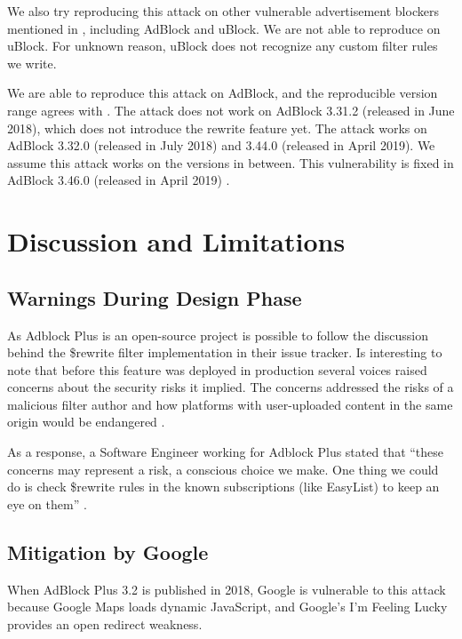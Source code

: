 \documentclass[conference]{IEEEtran}
\begin{document}
We also try reproducing this attack on other vulnerable advertisement blockers mentioned in \cite{abp_code_injection}, including AdBlock and uBlock. We are not able to reproduce on uBlock. For unknown reason, uBlock does not recognize any custom filter rules we write.

We are able to reproduce this attack on AdBlock, and the reproducible version range agrees with \cite{abp_code_injection}. The attack does not work on AdBlock 3.31.2 (released in June 2018), which does not introduce the rewrite feature yet. The attack works on AdBlock 3.32.0 (released in July 2018) and 3.44.0 (released in April 2019). We assume this attack works on the versions in between. This vulnerability is fixed in AdBlock 3.46.0 (released in April 2019) \cite{cr4chrome_ab}.

\section{Discussion and Limitations}

\subsection{Warnings During Design Phase}

As Adblock Plus is an open-source project is possible to follow the discussion behind the \$rewrite filter implementation in their issue tracker. Is interesting to note that before this feature was deployed in production several voices raised concerns about the security risks it implied. 
The concerns addressed the risks of a malicious filter author and how platforms with user-uploaded content in the same origin would be endangered \cite{abp_issue_6622}.

As a response, a Software Engineer working for Adblock Plus stated that ``these concerns may represent a risk, a conscious choice we make. One thing we could do is check \$rewrite rules in the known subscriptions (like EasyList) to keep an eye on them'' \cite{abp_issue_6622}.

\subsection{Mitigation by Google}
\label{subsec:google_mitigate}

When AdBlock Plus 3.2 is published in 2018, Google is vulnerable to this attack because Google Maps loads dynamic JavaScript, and Google's I'm Feeling Lucky provides an open redirect weakness.
\end{document}
